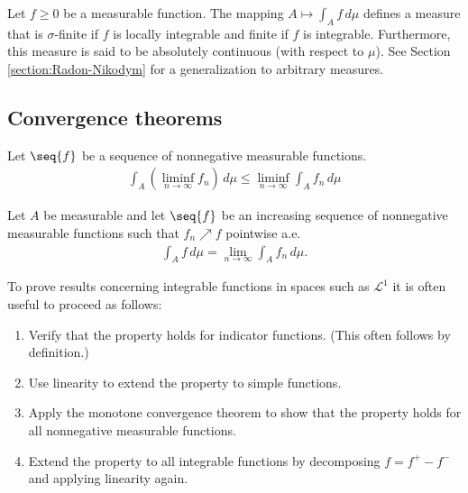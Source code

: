     \begin{property}\label{lebesgue:measure_by_integral}
        Let $f\geq0$ be a measurable function. The mapping $A\mapsto\int_Af\,d\mu$ defines a measure that is $\sigma$-finite if $f$ is locally integrable and finite if $f$ is integrable. Furthermore, this measure is said to be absolutely continuous (with respect to $\mu$). See Section \ref{section:Radon-Nikodym} for a generalization to arbitrary measures.
    \end{property}

\subsection{Convergence theorems}

    \begin{theorem}\label{lebesgue:fatous_lemma}
        Let $\seq{f}$ be a sequence of nonnegative measurable functions.
        \begin{gather}
            \int_A\left(\liminf_{n\rightarrow\infty}f_n\right)\,d\mu \leq \liminf_{n\rightarrow\infty}\int_Af_n\,d\mu
        \end{gather}
    \end{theorem}
    \begin{theorem}\label{lebesgue:monotone_convergence_theorem}
        Let $A$ be measurable and let $\seq{f}$ be an increasing sequence of nonnegative measurable functions such that $f_n\nearrow f$ pointwise a.e.
        \begin{gather}
            \int_Af\,d\mu = \lim_{n\rightarrow\infty}\int_Af_n\,d\mu.
        \end{gather}
    \end{theorem}

    \begin{method}\label{lebesgue:linear_proofs}
        To prove results concerning integrable functions in spaces such as $\mathcal{L}^1$ it is often useful to proceed as follows:
        \begin{enumerate}
            \item Verify that the property holds for indicator functions. (This often follows by definition.)
            \item Use linearity to extend the property to simple functions.
            \item Apply the monotone convergence theorem to show that the property holds for all nonnegative measurable functions.
            \item Extend the property to all integrable functions by decomposing $f = f^+-f^-$ and applying linearity again.
        \end{enumerate}
    \end{method}

